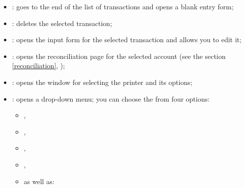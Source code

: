 \begin{itemize}
	\item {}: goes to the end of the list of transactions and opens a blank entry form;
	\item {}: deletes the selected transaction;
	\item {}: opens the input form for the selected transaction and allows you to edit it;
	\item {}: opens the reconciliation page for the selected account (see the section \vref{reconciliation}, );
	\item {}: opens the window for selecting the printer and its options;
	\item {}: opens a drop-down menu; you can choose the  from four options:
		\begin{itemize} 
	 		\item {},
	 		\item {},
	 		\item {},
	 		\item {},
		 	\item[] \hspace{-15pt} as well as:

\end{itemize}
\end{itemize}
